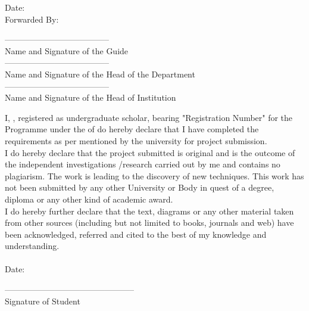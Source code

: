 \documentclass[11pt, a4paper, oneside]{Thesis} %
\begin{document}
\vspace{20.00mm}

\begin{minipage}{0.49\textwidth}
		\begin{flushleft}
			{Date:\\ [30px]
             \newblock
			Forwarded By:}
		\end{flushleft}
\end{minipage}
\begin{minipage}{0.49\textwidth}
	\begin{flushleft} \large
			{--------------------------------------\\[3px]
			Name and Signature of the Guide\\[3px]
			--------------------------------------\\[3px]
            Name and Signature of the Head of the Department\\[3px]
            --------------------------------------\\[3px]
            Name and Signature of the Head of Institution\\[3px]
			}
	\end{flushleft}		
\end{minipage}
\vfill
\clearpage %
I, \authornames, registered as undergraduate scholar, bearing "Registration Number" for the \degreename Programme under the \DEPTNAME of \univname do hereby declare that I have completed the requirements as per mentioned by the university for project submission. \\
I do hereby declare that the project submitted is original and is the outcome of the independent investigations /research carried out by me and contains no plagiarism. The work is leading to the discovery of new techniques. This work has not been submitted by any other University or Body in quest of a degree, diploma or any other kind of academic award. \\
I do hereby further declare that the text, diagrams or any other material taken from other sources (including but not limited to books, journals and web) have been acknowledged, referred and cited to the best of my knowledge and understanding. \\ \\

Date:
\begin{flushright}
-----------------------------------------------\\
Signature of Student \\
\end{flushright}
\vfill
\clearpage %
\end{document}
